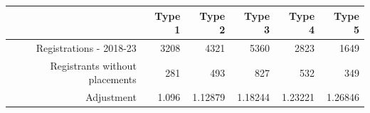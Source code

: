 \begin{tabular}{rrrrrr}
  \hline
   & \textbf{Type 1} & \textbf{Type 2} & \textbf{Type 3} & \textbf{Type 4} & \textbf{Type 5} \\\hline
  Registrations - 2018-23 & 3208 & 4321 & 5360 & 2823 & 1649 \\
  Registrants without placements & 281 & 493 & 827 & 532 & 349 \\
  Adjustment & 1.096 & 1.12879 & 1.18244 & 1.23221 & 1.26846 \\\hline
\end{tabular}
